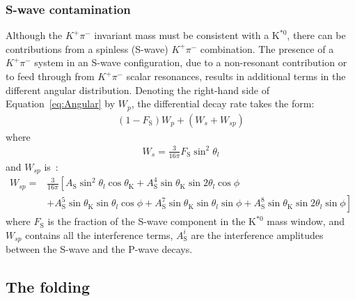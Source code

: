 \subsubsection{S-wave contamination}
\label{sec:S-waveform}

Although the $K^+\pi^-$ invariant mass must be consistent with a $\text{K}^{*0}$, there can be contributions from a spinless (S-wave) $K^+\pi^-$ combination.
The presence of a $K^+\pi^-$ system in an S-wave configuration, due to a non-resonant contribution or to feed through from $K^+\pi^-$ scalar resonances, results in additional terms in the different angular distribution.
Denoting the right-hand side of Equation~\ref{eq:Angular} by $W_p$, the differential decay rate takes the form:
\begin{equation} \label{eq:S-wave}
  \begin{split}
    (1-F_\mathrm{S})W_p + (W_s + W_{sp})
  \end{split}
\end{equation}
where 
\begin{equation} \label{eq:S-wave0}
  \begin{split}
    W_s = \frac{3}{16\pi} F_\mathrm{S}\sin^2\theta_l
  \end{split}
\end{equation}
and $W_{sp}$ is~\cite{Genon:Swave}:
\begin{equation} \label{eq:S-wave1}
  \begin{split}
    W_{sp}= &\frac{3}{16 \pi}\left[ A_\mathrm{S}\sin^2\theta_l\cos\theta_\mathrm{K}+ A_\mathrm{S}^4\sin\theta_\mathrm{K}\sin2\theta_l\cos\phi\right.\\
      &+\left.A^5_\mathrm{S}\sin\theta_\mathrm{K}\sin\theta_l\cos\phi+A_\mathrm{S}^7\sin\theta_\mathrm{K}\sin\theta_l\sin\phi+A_\mathrm{S}^8\sin\theta_\mathrm{K}\sin2\theta_l\sin\phi\right]
  \end{split}
\end{equation}
where $F_\mathrm{S}$ is the fraction of the S-wave component in the $\text{K}^{*0}$ mass window, and $W_{sp}$ contains all the interference terms, $A_\mathrm{S}^i$ are the interference amplitudes between the S-wave and the P-wave decays\cite{Genon:Swave}.

\subsection{The \pdf folding}
\label{sec:folding}

